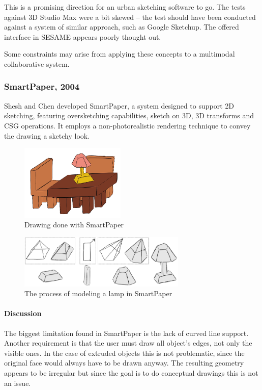 This is a promising direction for an urban sketching software to go.
The tests against 3D Studio Max were a bit skewed -- the test should
have been conducted against a system of similar approach, such as Google Sketchup.
The offered interface in SESAME appears poorly thought out.

Some constraints may arise from applying these concepts to a multimodal collaborative
system.



\subsubsection{SmartPaper, 2004}

Shesh and Chen \cite{SMARTPAPER} developed SmartPaper, a system designed to support
2D sketching, featuring oversketching capabilities, sketch on 3D, 3D transforms and
CSG operations. It employs a non-photorealistic rendering technique to convey the
drawing a sketchy look.

\begin{figure}[!ht]
	\centering
	\includegraphics[width=5cm]{gfx/smartpaper.png}
	\caption{Drawing done with SmartPaper}
	\label{FIG-SMARTPAPER}
\end{figure}

\begin{figure}[!ht]
	\centering
	\includegraphics[width=8cm]{gfx/smartpaper2.png}
	\caption{The process of modeling a lamp in SmartPaper}
	\label{FIG-SMARTPAPER2}
\end{figure}

\paragraph{Discussion}

The biggest limitation found in SmartPaper is the lack of curved line support.
Another requirement is that the user must draw all object's edges, not only
the visible ones. In the case of extruded objects this is not problematic, since
the original face would always have to be drawn anyway.
The resulting geometry appears to be irregular but since the goal is to do
conceptual drawings this is not an issue.

